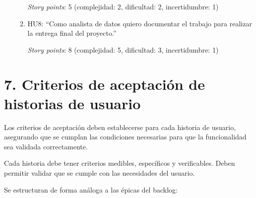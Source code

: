\documentclass[
11pt, %
]{charter}
\begin{document}
\begin{enumerate}
\begin{enumerate}
		\textit{Story points}: 5 (complejidad: 2, dificultad: 2, incertidumbre: 1)
		
		\item HU8: “Como analista de datos quiero documentar el trabajo para realizar la entrega final del proyecto.”
		
		\textit{Story points}: 8 (complejidad: 5, dificultad: 3, incertidumbre: 1)
		
	\end{enumerate}
\end{enumerate}


\section{7. Criterios de aceptación de historias de usuario}
\label{sec:criteriosAceptacion}

Los criterios de aceptación deben establecerse para cada historia de usuario, asegurando que se cumplan las condiciones necesarias para que la funcionalidad sea validada correctamente.

Cada historia debe tener criterios medibles, específicos y verificables. Deben permitir validar que se cumple con las necesidades del usuario.

Se estructuran de forma análoga a las \'{e}picas del backlog:
\end{document}
